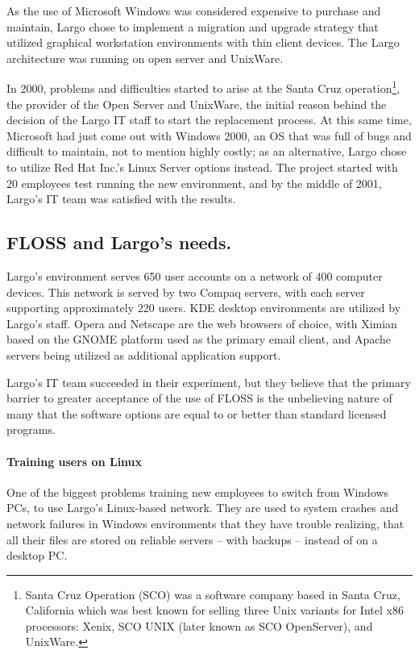 As the use of Microsoft Windows was considered expensive to purchase and maintain, Largo chose to implement a migration and upgrade strategy that utilized graphical workstation environments with thin client devices. The Largo architecture was running on open server and UnixWare. 

In 2000, problems and difficulties started to arise at the Santa Cruz operation\footnote{Santa Cruz Operation (SCO) was a software company based in Santa Cruz, California which was best known for selling three Unix variants for Intel x86 processors: Xenix, SCO UNIX (later known as SCO OpenServer), and UnixWare.}, the provider of the Open Server and UnixWare, the initial reason behind the decision of the Largo IT staff to start the replacement process. At this same time, Microsoft had just come out with Windows 2000, an OS that was full of bugs and difficult to maintain, not to mention highly costly; as an alternative, Largo chose to utilize Red Hat Inc.’s Linux Server options instead. The project started with 20 employees test running the new environment, and by the middle of 2001, Largo’s IT team was satisfied with the results.

\subsection{FLOSS and Largo’s needs.}

 Largo’s environment serves 650 user accounts on a network of 400 computer devices. This network is served by two Compaq servers, with each server supporting approximately 220 users. KDE desktop environments are utilized by Largo’s staff. Opera and Netscape are the web browsers of choice, with Ximian based on the GNOME platform used as the primary email client, and Apache servers being utilized as additional application support.
 
  Largo’s IT team succeeded in their experiment, but they believe that the primary barrier to greater acceptance of the use of FLOSS is the unbelieving nature of many that the software options are equal to or better than standard licensed programs.

\paragraph{Training users on Linux}
One of the biggest problems training new employees to switch from Windows PCs, to use Largo's Linux-based network. 
They are used to system crashes and network failures in Windows environments that they have trouble realizing, that all their files are stored on reliable servers -- with backups -- instead of on a desktop PC.

